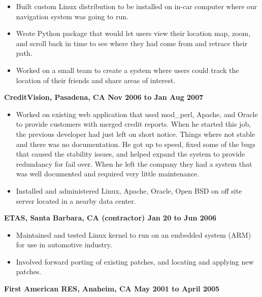 \documentclass{res}
\begin{document}
\begin{resume}
\begin{itemize}
\item Built custom Linux distribution to be installed on in-car
computer where our navigation system was going to run.

\item Wrote Python package that would let users view their location
map, zoom, and scroll back in time to see where they had come from
and retrace their path.

\item Worked on a small team to create a system where users could
track the location of their friends and share areas of interest.

\end{itemize}

{\large \bf CreditVision, Pasadena, CA \hfill Nov 2006 to Jan Aug 2007}
\begin{itemize}

\item Worked on existing web application that used mod\_perl, Apache,
and Oracle to provide customers with merged credit reports.  When he
started this job, the previous developer had just left on short notice.
Things where not stable and there was no documentation.  He got up to
speed, fixed some of the bugs that caused the stability issues, and
helped expand the system to provide redundancy for fail over.  When he
left the company they had a system that was well documented and required
very little maintenance.

\item Installed and administered Linux, Apache, Oracle, Open BSD on off
site server located in a nearby data center.

\end{itemize}

{\large \bf ETAS, Santa Barbara, CA (contractor) \hfill Jan 20 to Jun 2006}
\begin{itemize}

\item Maintained and tested Linux kernel to run on an embedded system
(ARM) for use in automotive industry.

\item Involved forward porting of existing patches, and locating and
applying new patches.

\end{itemize}


{\large \bf First American RES, Anaheim, CA \hfill May 2001 to April 2005}
\begin{itemize}


\end{itemize}
\end{resume}
\end{document}
